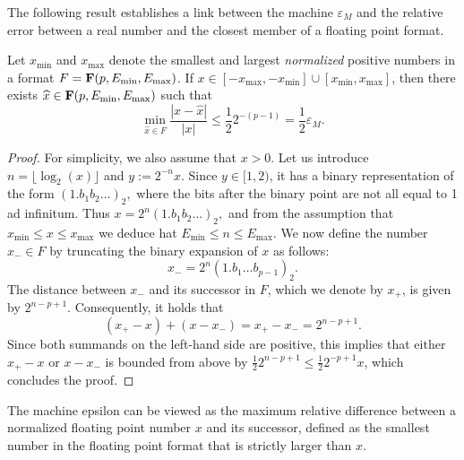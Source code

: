 The following result establishes a link between the machine $\varepsilon_M$ and
the relative error between a real number and the closest member of a floating point format.
\begin{proposition}
    \label{prop:relative_error_and_machine_epsilon}
    Let $x_{\min}$ and $x_{\max}$ denote the smallest and largest \emph{normalized} positive numbers in a format $F = \mathbf F(p, E_{\min}, E_{\max})$.
    If $x \in [-x_{\max}, -x_{\min}] \cup [x_{\min}, x_{\max}]$,
    then there exists $\widehat x \in \mathbf F(p, E_{\min}, E_{\max})$ such that
    \begin{equation}
        \label{eq:bound_epsilon_machine}
        \min_{\widehat x \in F} \frac{|x - \widehat x|}{|x|} \leq \frac{1}{2} 2^{-(p-1)}
        = \frac{1}{2} \varepsilon_M.
    \end{equation}
\end{proposition}
\begin{proof}
    For simplicity, we also assume that $x > 0$.
    Let us introduce $n = \lfloor \log_2(x) \rfloor$ and $y := 2^{-n} x$.
    Since $y \in [1, 2)$,
    it has a binary representation of the form
    \(
        (1.b_1 b_2\dots)_2,
    \)
    where the bits after the binary point are not all equal to 1 ad infinitum.
    Thus
    \(
        x = 2^{n} (1.b_1 b_2\dots)_2,
    \)
    and from the assumption that $x_{\min} \leq x \leq x_{\max}$
    we deduce hat $E_{\min} \leq n \leq E_{\max}$.
    We now define the number $x_- \in F$ by truncating the binary expansion of $x$ as follows:
    \[
        x_- = 2^n (1.b_1 \dots b_{p-1})_2.
    \]
    The distance between $x_-$ and its successor in $F$,
    which we denote by $x_+$, is given by $2^{n-p+1}$.
    Consequently, it holds that
    \[
        (x_+ - x) + (x-x_-) = x_+ - x_- = 2^{n-p+1}.
    \]
    Since both summands on the left-hand side are positive,
    this implies that either $x_+ - x$ or $x - x_-$ is bounded from above by $\frac{1}{2} 2^{n-p+1} \leq \frac{1}{2} 2^{-p+1}x$,
    which concludes the proof.
\end{proof}

The machine epsilon can be viewed as the maximum relative difference between a normalized floating point number $x$ and its successor,
defined as the smallest number in the floating point format that is strictly larger than $x$.

